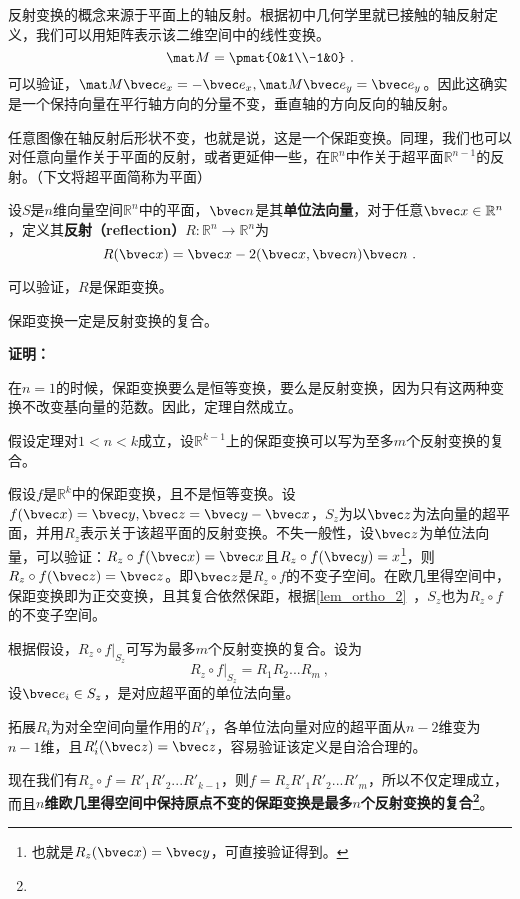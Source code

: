 反射变换的概念来源于平面上的轴反射。根据初中几何学里就已接触的轴反射定义，我们可以用矩阵表示该二维空间中的线性变换。
\begin{equation}
\mat M=\pmat{0&1\\-1&0}~.
\end{equation}
可以验证，$\mat M\bvec e_x=-\bvec e_x,\mat M \bvec e_y=\bvec e_y$。因此这确实是一个保持向量在平行轴方向的分量不变，垂直轴的方向反向的轴反射。

任意图像在轴反射后形状不变，也就是说，这是一个保距变换。同理，我们也可以对任意向量作关于平面的反射，或者更延伸一些，在$\mathbb R^n$中作关于超平面$\mathbb R^{n-1}$的反射。（下文将超平面简称为平面）
\begin{definition}{}
设$S$是$n$维向量空间$\mathbb R^n$中的平面，$\bvec n$是其\textbf{单位法向量}，对于任意$\bvec x\in \mathbb R^n$，定义其\textbf{反射（reflection）}$R:\mathbb R^n\rightarrow \mathbb R^n$为
\begin{equation}
R(\bvec x)=\bvec x-2(\bvec x,\bvec n)\bvec n~.
\end{equation}
\end{definition}
可以验证，$R$是保距变换。


\begin{theorem}{}
保距变换一定是反射变换的复合。
\end{theorem}
\textbf{证明：}

在$n=1$的时候，保距变换要么是恒等变换，要么是反射变换，因为只有这两种变换不改变基向量的范数。因此，定理自然成立。

假设定理对$1<n<k$成立，设$\mathbb R^{k-1}$上的保距变换可以写为至多$m$个反射变换的复合。 

假设$f$是$\mathbb R^k$中的保距变换，且不是恒等变换。设$f(\bvec x)=\bvec y,\bvec z=\bvec y-\bvec x$，$S_z$为以$\bvec z$为法向量的超平面，并用$R_z$表示关于该超平面的反射变换。不失一般性，设$\bvec z$为单位法向量，可以验证：$R_z\circ f(\bvec x)=\bvec x$且$R_z\circ f(\bvec y)=x$\footnote{也就是$R_z(\bvec x)=\bvec y$，可直接验证得到。}，则$R_z\circ f(\bvec z)=\bvec z$。即$\bvec z$是$R_z\circ f$的不变子空间。在欧几里得空间中，保距变换即为正交变换，且其复合依然保距，根据\autoref{lem_ortho_2}~，$S_z$也为$R_z\circ f$的不变子空间。

根据假设，$R_z\circ f|_{S_z}$可写为最多$m$个反射变换的复合。设为
\begin{equation}
R_z\circ f|_{S_z}=R_1R_2...R_{m}~,
\end{equation}
设$\bvec e_i\in S_z$，是对应超平面的单位法向量。

拓展$R_i$为对全空间向量作用的$R'_i$，各单位法向量对应的超平面从$n-2$维变为$n-1$维，且$R'_i(\bvec z)=\bvec z$，容易验证该定义是自洽合理的。

现在我们有$R_z \circ f=R'_1R'_2...R'_{k-1}$，则$f=R_zR'_1R'_2...R'_{m}$，所以不仅定理成立，而且\textbf{$n$维欧几里得空间中保持原点不变的保距变换是最多$n$个反射变换的复合\footnote{}}。